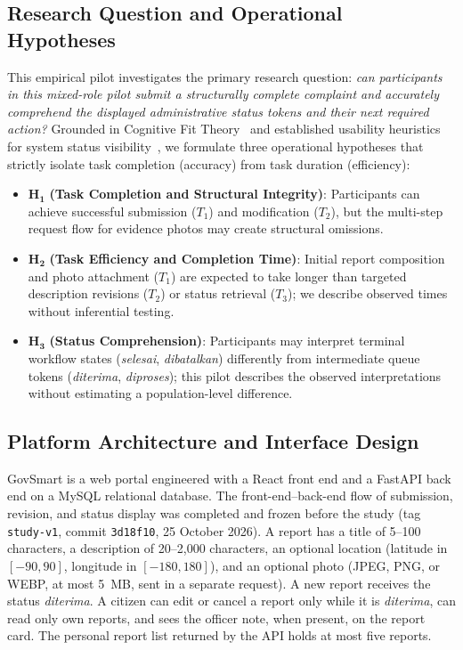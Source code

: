 \documentclass[11pt, runningheads, a4paper]{llncs}
\renewcommand{\st}[1]{\textit{#1}}
\newcommand{\rev}[1]{#1}
\begin{document}
\subsection{Research Question and Operational Hypotheses}
\rev{This empirical pilot investigates the primary research question: \emph{can participants in this mixed-role pilot submit a structurally complete complaint and accurately comprehend the displayed administrative status tokens and their next required action?}}
Grounded in Cognitive Fit Theory~\cite{bacic2022} and established usability heuristics for system status visibility~\cite{nielsen1994}, we formulate three operational hypotheses that strictly isolate task completion (accuracy) from task duration (efficiency):
\begin{itemize}
\item $\mathbf{H_1}$ \textbf{(Task Completion and Structural Integrity)}: Participants can achieve successful submission ($T_1$) and modification ($T_2$), but the multi-step request flow for evidence photos may create structural omissions.
\item $\mathbf{H_2}$ \textbf{(Task Efficiency and Completion Time)}: Initial report composition and photo attachment ($T_1$) are expected to take longer than targeted description revisions ($T_2$) or status retrieval ($T_3$); we describe observed times without inferential testing.
\item $\mathbf{H_3}$ \textbf{(Status Comprehension)}: Participants may interpret terminal workflow states (\st{selesai}, \st{dibatalkan}) differently from intermediate queue tokens (\st{diterima}, \st{diproses}); this pilot describes the observed interpretations without estimating a population-level difference.
\end{itemize}

\subsection{Platform Architecture and Interface Design}
GovSmart is a web portal engineered with a React front end and a FastAPI back end on a MySQL
relational database. The front-end--back-end flow of submission, revision, and status display
was completed and frozen before the study (tag \texttt{study-v1}, commit \texttt{3d18f10}, 25 October 2026).
A report has a title of 5--100 characters, a description of 20--2,000
characters, an optional location (latitude in $[-90,90]$, longitude in
$[-180,180]$), and an optional photo (JPEG, PNG, or WEBP, at most 5~MB, sent in
a separate request). A new report receives the status \st{diterima}. A citizen
can edit or cancel a report only while it is \st{diterima}, can read only own
reports, and sees the officer note, when present, on the report card. The
personal report list returned by the API holds at most five reports.
\end{document}
